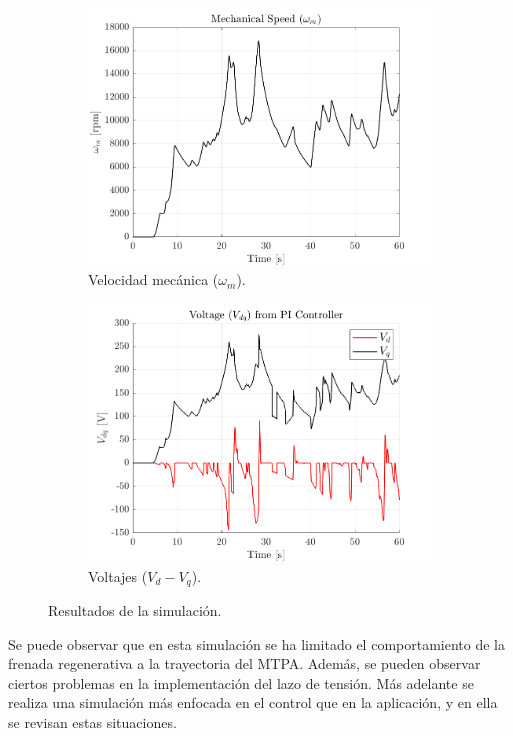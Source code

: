 \begin{figure}[!htb]
\begin{subfigure}{0.4\textwidth}
        \includegraphics[width=\linewidth]{fig/wm_plot.png}
        \caption{Velocidad mecánica ($\omega_{m}$).}
    \end{subfigure}
    \begin{subfigure}{0.4\textwidth}
        \includegraphics[width=\linewidth]{fig/vdvqPI_plot.png}
        \caption{Voltajes ($V_{d} - V_{q}$).}
    \end{subfigure}
    \caption{Resultados de la simulación.}
    
\end{figure}

Se puede observar que en esta simulación se ha limitado el comportamiento de la frenada regenerativa a la trayectoria del MTPA. Además, se pueden observar ciertos problemas en la implementación del lazo de tensión. Más adelante se realiza una simulación más enfocada en el control que en la aplicación, y en ella se revisan estas situaciones.

